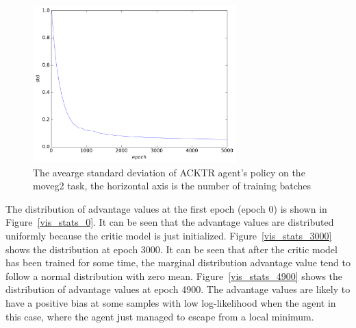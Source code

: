 \begin{figure}[!htbp]
\label{key}	\includegraphics[width=0.7\textwidth]{images/rec_180528_std_statlog.pdf}
	\centering
	\caption{The avearge standard deviation of ACKTR agent's policy on the moveg2 task, the horizontal axis is the number of training batches}\label{rec_stat_moveg2_std}
\end{figure}
The distribution of advantage values at the first epoch (epoch 0) is shown in Figure~\ref{vis_stats_0}. It can be seen that the advantage values are distributed uniformly because the critic model is just initialized. Figure~\ref{vis_stats_3000} shows the distribution at epoch 3000. It can be seen that after the critic model has been trained for some time, the marginal distribution advantage value tend to follow a normal distribution with zero mean.  Figure~\ref{vis_stats_4900} shows the distribution of advantage values at epoch 4900. The advantage values are likely to have a positive bias at some samples with low log-likelihood  when the agent in this case, where the agent just managed to escape from a local minimum.  

